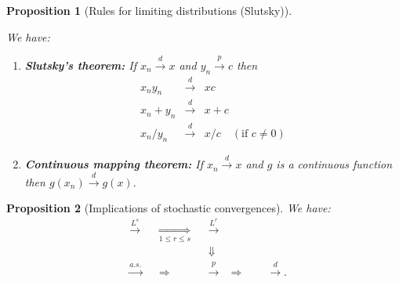 \documentclass[
]{book}
\newtheorem{proposition}{Proposition}[chapter]
\theoremstyle{definition}
\theoremstyle{definition}
\theoremstyle{definition}
\theoremstyle{definition}
\theoremstyle{remark}
\begin{document}
\begin{proposition}[Rules for limiting distributions (Slutsky)]
\protect\hypertarget{prp:Slutsky}{}\label{prp:Slutsky}

We have:

\begin{enumerate}
\def\labelenumi{\roman{enumi}.}
\item
  \textbf{Slutsky's theorem:} If \(x_n \overset{d}{\rightarrow} x\) and \(y_n \overset{p}{\rightarrow} c\) then
  \begin{eqnarray*}
  x_n y_n &\overset{d}{\rightarrow}& x c \\
  x_n + y_n &\overset{d}{\rightarrow}& x + c \\
  x_n/y_n &\overset{d}{\rightarrow}& x / c \quad (\mbox{if }c \ne 0)
  \end{eqnarray*}
\item
  \textbf{Continuous mapping theorem:} If \(x_n \overset{d}{\rightarrow} x\) and \(g\) is a continuous function then \(g(x_n) \overset{d}{\rightarrow} g(x).\)
\end{enumerate}

\end{proposition}

\begin{proposition}[Implications of stochastic convergences]
\protect\hypertarget{prp:implicationsconv}{}\label{prp:implicationsconv}We have:
\begin{align*}
&\boxed{\overset{L^s}{\rightarrow}}& &\underset{1 \le r \le s}{\Rightarrow}& &\boxed{\overset{L^r}{\rightarrow}}&\\
&& && &\Downarrow&\\
&\boxed{\overset{a.s.}{\rightarrow}}& &\Rightarrow& &\boxed{\overset{p}{\rightarrow}}& \Rightarrow \qquad \boxed{\overset{d}{\rightarrow}}.
\end{align*}
\end{proposition}
\end{document}
